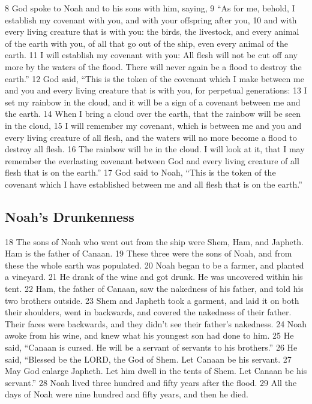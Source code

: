 {8} God spoke to Noah and to his sons with him, saying, {9} ``As for me,
behold, I establish my covenant with you, and with your offspring after
you, {10} and with every living creature that is with you: the birds,
the livestock, and every animal of the earth with you, of all that go
out of the ship, even every animal of the earth. {11} I will establish
my covenant with you: All flesh will not be cut off any more by the
waters of the flood. There will never again be a flood to destroy the
earth.'' {12} God said, ``This is the token of the covenant which I make
between me and you and every living creature that is with you, for
perpetual generations: {13} I set my rainbow in the cloud, and it will
be a sign of a covenant between me and the earth. {14} When I bring a
cloud over the earth, that the rainbow will be seen in the cloud, {15} I
will remember my covenant, which is between me and you and every living
creature of all flesh, and the waters will no more become a flood to
destroy all flesh. {16} The rainbow will be in the cloud. I will look at
it, that I may remember the everlasting covenant between God and every
living creature of all flesh that is on the earth.'' {17} God said to
Noah, ``This is the token of the covenant which I have established
between me and all flesh that is on the earth.''

\hypertarget{noahs-drunkenness}{%
\subsection{Noah's Drunkenness}\label{noahs-drunkenness}}

{18} The sons of Noah who went out from the ship were Shem, Ham, and
Japheth. Ham is the father of Canaan. {19} These three were the sons of
Noah, and from these the whole earth was populated. {20} Noah began to
be a farmer, and planted a vineyard. {21} He drank of the wine and got
drunk. He was uncovered within his tent. {22} Ham, the father of Canaan,
saw the nakedness of his father, and told his two brothers outside. {23}
Shem and Japheth took a garment, and laid it on both their shoulders,
went in backwards, and covered the nakedness of their father. Their
faces were backwards, and they didn't see their father's nakedness. {24}
Noah awoke from his wine, and knew what his youngest son had done to
him. {25} He said, ``Canaan is cursed. He will be a servant of servants
to his brothers.'' {26} He said, ``Blessed be the LORD, the God of Shem.
Let Canaan be his servant. {27} May God enlarge Japheth. Let him dwell
in the tents of Shem. Let Canaan be his servant.'' {28} Noah lived three
hundred and fifty years after the flood. {29} All the days of Noah were
nine hundred and fifty years, and then he died.

